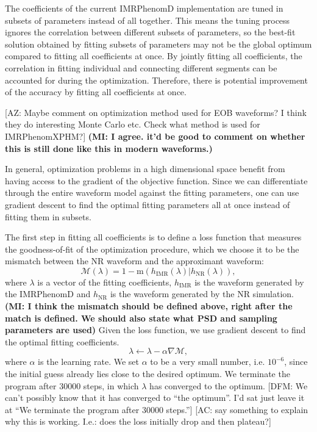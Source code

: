 \documentclass[twocolumn]{aastex631}
\newcommand{\AZ}[1]{{\color{Burnt}[AZ: #1]}}
\newcommand{\mi}[1]{\textbf{\color{teal}(MI: #1)}}
\newcommand{\dfm}[1]{{\color{dfm}[DFM: #1]}}
\newcommand{\amc}[1]{{\color{red}[AC: #1]}}
\begin{document}
The coefficients of the current IMRPhenomD implementation are tuned in subsets
of parameters instead of all together. This means the tuning process ignores the
correlation between different subsets of parameters, so the best-fit
solution obtained by fitting subsets of parameters may not be the global
optimum compared to fitting all coefficients at once. By jointly
fitting all coefficients, the correlation in fitting individual and connecting
different segments can be accounted for during the optimization. Therefore, there is
potential improvement of the accuracy by fitting all coefficients at once.

\AZ{Maybe comment on optimization method used for EOB waveforms?
I think they do interesting Monte Carlo etc. Check what method is used 
for IMRPhenomXPHM?}
\mi{I agree. it'd be good to comment on whether this is still done like this in
modern waveforms.}

In general, optimization problems in a high dimensional space benefit from
having access to the gradient of the objective function. Since we can
differentiate through the entire waveform model against the fitting parameters,
one can use gradient descent to find the optimal fitting parameters all at once
instead of fitting them in subsets.




The first step in fitting all coefficients is to define a loss function that
measures the goodness-of-fit of the optimization procedure, which we choose it
to be the mismatch between the NR waveform and the approximant waveform:
\begin{equation}
    \label{eq:mismatch}
	\mathcal{M}(\lambda)=1-\mathrm{m}(h_{\mathrm{IMR}}(\lambda)|h_{\mathrm{NR}}(\lambda)),
\end{equation}
where $\lambda$ is a vector of the fitting coefficients, $h_{\mathrm{IMR}}$ is
the waveform generated by the IMRPhenomD and $h_{\mathrm{NR}}$ is the waveform
generated by the NR simulation. 
\mi{I think the mismatch should be defined above, right after the match is defined. We should also state what PSD and sampling parameters are used}
Given the loss function, we use gradient descent to find the optimal fitting
coefficients.
\begin{equation}
	\lambda\leftarrow\lambda-\alpha\nabla\mathcal{M}, 
\end{equation}
where $\alpha$ is the learning rate. We set $\alpha$ to be a very small number, i.e. $10^{-6}$, since the initial guess already lies close to the desired optimum. We terminate the program after 30000 steps, in which $\lambda$ has converged to the optimum.  \dfm{We can't possibly know that it has converged to ``the optimum''. I'd sat just leave it at ``We terminate the program after 30000 steps.''}
\amc{say something to explain why this is working. I.e.: does the loss initially drop and then plateau?}
\end{document}
